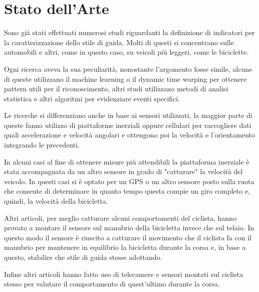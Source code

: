\documentclass[class=article]{standalone}
\begin{document}
	\section{Stato dell'Arte}
	Sono già stati effettuati numerosi studi riguardanti la definizione di indicatori per la caratterizzazione dello stile di guida.
	Molti di questi si concentrano sulle automobili e altri, come in questo caso, su veicoli più leggeri, come le biciclette.
	
	Ogni ricerca aveva la sua peculiarità, nonostante l'argomento fosse simile, alcune di queste utilizzano il machine learning o il dynamic time warping per ottenere pattern utili per il riconoscimento, altri studi utilizzano metodi di analisi statistica e altri algoritmi per evidenziare eventi specifici.
	
	Le ricerche si differenziano anche in base ai sensori utilizzati, la maggior parte di queste fanno utilizzo di piattaforme inerziali oppure cellulari per raccogliere dati quali accelerazione e velocità angolari e ottengono poi la velocità e l'orientamento integrando le precedenti.
	
	In alcuni casi al fine di ottenere misure più attendibili la piattaforma inerziale è stata accompagnata da un altro sensore in grado di "catturare" la velocità del veicolo. In questi casi si è optato per un GPS o un altro sensore posto sulla ruota che consente di determinare in quanto tempo questa compie un giro completo e, quindi, la velocità della bicicletta.
	
	Altri articoli, per meglio catturare alcuni comportamenti del ciclista, hanno provato a montare il sensore sul manubrio della bicicletta invece che sul telaio. In questo modo il sensore è riuscito a catturare il movimento che il ciclista fa con il manubrio per mantenere in equilibrio la bicicletta durante la corsa e, in base a questo, stabilire che stile di guida stesse adottando.
	
	Infine altri articoli hanno fatto uso di telecamere e sensori montati sul ciclista stesso per valutare il comportamento di quest'ultimo durante la corsa.\hfill\break
	
	
%	
	
	
	
	
	
\end{document}
